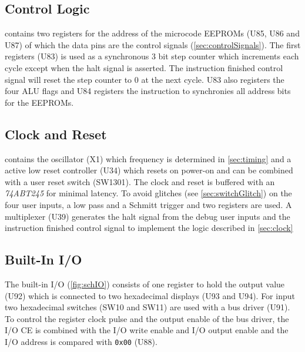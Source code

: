 \subsection{Control Logic}\label{sec:schControl}
 contains two registers for the address of the microcode \glspl{EEPROM} (U85, U86 and U87) of which the data pins are the control signals (\cref{sec:controlSignals}).
The first registers (U83) is used as a synchronous 3 bit step counter which increments each cycle except when the halt signal is asserted.
The instruction finished control signal will reset the step counter to 0 at the next cycle.
U83 also registers the four \gls{ALU} flags and U84 registers the instruction to synchronies all address bits for the \glspl{EEPROM}.

\subsection{Clock and Reset}\label{sec:schClock}
 contains the oscillator (X1) which frequency is determined in \cref{sec:timing} and a active low reset controller (U34) which resets on power-on and can be combined with a user reset switch (SW1301).
The clock and reset is buffered with an \emph{74ABT245} for minimal latency.
To avoid glitches (see \cref{sec:switchGlitch}) on the four user inputs, a low pass and a Schmitt trigger and two registers are used.
A multiplexer (U39) generates the halt signal from the debug user inputs and the instruction finished control signal to implement the logic described in \cref{sec:clock}

\subsection{Built-In I/O}
The built-in I/O (\cref{fig:schIO}) consists of one register to hold the output value (U92) which is connected to two hexadecimal displays (U93 and U94).
For input two hexadecimal switches (SW10 and SW11) are used with a bus driver (U91).
To control the register clock pulse and the output enable of the bus driver, the I/O \gls{CE} is combined with the I/O write enable and I/O output enable and the I/O address is compared with \texttt{0x00} (U88).

